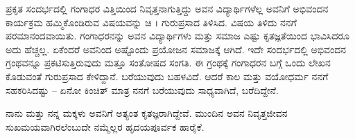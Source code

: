 ಪ್ರಕೃತ ಸಂದರ್ಭದಲ್ಲಿ ಗಂಗಾಧರ ವಿತ್ತಿಯಿಂದ ನಿವೃತ್ತನಾಗುತ್ತಿದ್ದು ಅವನ ವಿದ್ಯಾರ್ಥಿಗಳೆಲ್ಲ ಅವನಿಗೆ ಅಭಿವಂದನ ಕಾರ್ಯಕ್ರಮ ಹಮ್ಮಿಕೊಂಡಿರುವ ವಿಷಯವನ್ನು ಚಿ । ಗುರುಪ್ರಸಾದ ತಿಳಿಸಿದ. ವಿಷಯ ತಿಳಿದು ನನಗೆ ಪರಮಾನಂದವಾಯಿತು. ಗಂಗಾಧರನನ್ನು ಅವನ ವಿದ್ಯಾರ್ಥಿಗಳು ಮತ್ತು ಸಮಾಜ ಎಷ್ಟು ಕೃತಜ್ಞತೆಯಿಂದ ಭಾವಿಸಿದರೂ ಅದು ಹೆಚ್ಚಲ್ಲ. ಏಕೆಂದರೆ ಅವನಿಂದ ಅಷ್ಟೊಂದು ಪ್ರಯೋಜನ ಸಮಾಜಕ್ಕೆ ಆಗಿದೆ. ಇದೇ ಸಂದರ್ಭದಲ್ಲಿ ಅಭಿವಂದನ ಗ್ರಂಥವನ್ನೂ ಪ್ರಕಟಿಸುತ್ತಿರುವುದು ಮತ್ತೂ ಸಂತೋಷದ ಸಂಗತಿ. ಈ ಗ್ರಂಥಕ್ಕೆ ಗಂಗಾಧರನ ಬಗ್ಗೆ ಒಂದು ಲೇಖನ ಕೊಡುವಂತೆ ಗುರುಪ್ರಸಾದ ಕೇಳಿದ್ದಾನೆ. ಬರೆಯುವುದು ಬಹಳವಿದೆ. ಆದರೆ ಕಾಲ ಮತ್ತು ವಯೋಧರ್ಮ ನನಗೆ ಸಹಕರಿಸಿದಷ್ಟು – ಏನೋ ಕಿಂಚಿತ್ ಮಾತ್ರ ನನಗೆ ಬರೆಯುವುದು ಸಾಧ್ಯವಾಗಿದೆ, ಬರೆದಿದ್ದೇನೆ.  

ನಾನು ಮತ್ತು ನನ್ನ ಮಕ್ಕಳು ಅವನಿಗೆ ಅತ್ಯಂತ ಕೃತಜ್ಞರಾಗಿದ್ದೇವೆ. ಮುಂದಿನ ಅವನ ನಿವೃತ್ತಜೀವನ ಸುಖಮಯವಾಗಿರಲೆಂಬುದೇ ನಮ್ಮೆಲ್ಲರ ಹೃದಯಪೂರ್ವಕ ಹಾರೈಕೆ.

\articleend	
